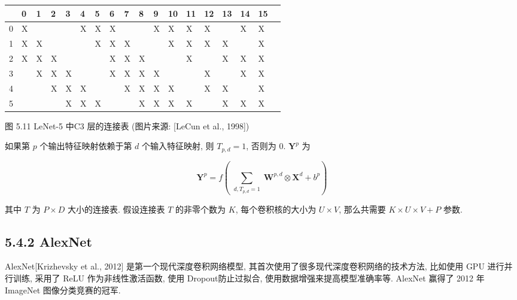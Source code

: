 \documentclass[10pt]{article}
\begin{document}
\begin{center}
\begin{tabular}{l|lllllllllllllllll}
 & 0 & 1 & 2 & 3 & 4 & 5 & 6 & 7 & 8 & 9 & 10 & 11 & 12 & 13 & 14 & 15 \\
\hline
0 & $\mathrm{X}$ &  &  &  & $\mathrm{X}$ & $\mathrm{X}$ & $\mathrm{X}$ &  &  & $\mathrm{X}$ & $\mathrm{X}$ & $\mathrm{X}$ & $\mathrm{X}$ &  & $\mathrm{X}$ & $\mathrm{X}$ \\
1 & $\mathrm{X}$ & $\mathrm{X}$ &  &  &  & $\mathrm{X}$ & $\mathrm{X}$ & $\mathrm{X}$ &  &  & $\mathrm{X}$ & $\mathrm{X}$ & $\mathrm{X}$ & $\mathrm{X}$ &  & $\mathrm{X}$ \\
2 & $\mathrm{X}$ & $\mathrm{X}$ & $\mathrm{X}$ &  &  &  & $\mathrm{X}$ & $\mathrm{X}$ & $\mathrm{X}$ &  &  & $\mathrm{X}$ &  & $\mathrm{X}$ & $\mathrm{X}$ & $\mathrm{X}$ \\
3 &  & $\mathrm{X}$ & $\mathrm{X}$ & $\mathrm{X}$ &  &  & $\mathrm{X}$ & $\mathrm{X}$ & $\mathrm{X}$ & $\mathrm{X}$ &  &  & $\mathrm{X}$ &  & $\mathrm{X}$ & $\mathrm{X}$ \\
4 &  &  & $\mathrm{X}$ & $\mathrm{X}$ & $\mathrm{X}$ &  &  & $\mathrm{X}$ & $\mathrm{X}$ & $\mathrm{X}$ & $\mathrm{X}$ &  & $\mathrm{X}$ & $\mathrm{X}$ &  & $\mathrm{X}$ \\
5 &  &  &  & $\mathrm{X}$ & $\mathrm{X}$ & $\mathrm{X}$ &  &  & $\mathrm{X}$ & $\mathrm{X}$ & $\mathrm{X}$ & $\mathrm{X}$ &  & $\mathrm{X}$ & $\mathrm{X}$ & $\mathrm{X}$ \\
\hline
\end{tabular}
\end{center}

图 5.11 LeNet-5 中C3 层的连接表 (图片来源: [LeCun et al., 1998])

如果第 $p$ 个输出特征映射依赖于第 $d$ 个输入特征映射, 则 $T_{p, d}=1$, 否则为 0. $\boldsymbol{Y}^{p}$ 为


\begin{equation*}
\boldsymbol{Y}^{p}=f\left(\sum_{\substack{d, T_{p, d}=1}} \boldsymbol{W}^{p, d} \otimes \boldsymbol{X}^{d}+b^{p}\right) \tag{5.40}
\end{equation*}


其中 $T$ 为 $P \times D$ 大小的连接表. 假设连接表 $T$ 的非零个数为 $K$, 每个卷积核的大小为 $U \times V$, 那么共需要 $K \times U \times V+P$ 参数.

\subsection*{5.4.2 AlexNet}
AlexNet[Krizhevsky et al., 2012] 是第一个现代深度卷积网络模型, 其首次使用了很多现代深度卷积网络的技术方法, 比如使用 GPU 进行并行训练, 采用了 ReLU 作为非线性激活函数, 使用 Dropout防止过拟合, 使用数据增强来提高模型准确率等. AlexNet 赢得了 2012 年 ImageNet 图像分类竞赛的冠军.
\end{document}
